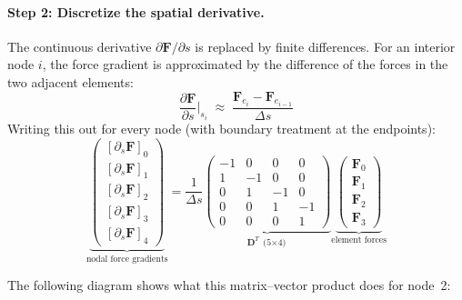 \documentclass[11pt]{article}
\newcommand{\vect}[1]{\mathbf{#1}}
\newcommand{\mat}[1]{\mathbf{#1}}
\newcommand{\dds}[1]{\frac{\partial #1}{\partial s}}
\begin{document}
\paragraph{Step 2: Discretize the spatial derivative.}
The continuous derivative $\partial \vect{F} / \partial s$ is replaced by finite differences.
For an interior node $i$, the force gradient is approximated by the difference of the forces in the two adjacent elements:
\begin{equation}
  \dds{\vect{F}}\bigg|_{s_i} \;\approx\; \frac{\vect{F}_{e_i} - \vect{F}_{e_{i-1}}}{\Delta s}
  \label{eq:fd-force}
\end{equation}
Writing this out for every node (with boundary treatment at the endpoints):
\begin{equation}
  \underbrace{\begin{pmatrix}
    [\partial_s \vect{F}]_0 \\ [\partial_s \vect{F}]_1 \\ [\partial_s \vect{F}]_2 \\ [\partial_s \vect{F}]_3 \\ [\partial_s \vect{F}]_4
  \end{pmatrix}}_{\text{nodal force gradients}}
  = \frac{1}{\Delta s}
  \underbrace{\begin{pmatrix}
    -1 &  0 &  0 &  0 \\
     1 & -1 &  0 &  0 \\
     0 &  1 & -1 &  0 \\
     0 &  0 &  1 & -1 \\
     0 &  0 &  0 &  1
  \end{pmatrix}}_{\mat{D}^T \;\text{(5$\times$4)}}
  \underbrace{\begin{pmatrix}
    \vect{F}_0 \\ \vect{F}_1 \\ \vect{F}_2 \\ \vect{F}_3
  \end{pmatrix}}_{\text{element forces}}
  \label{eq:DT-example}
\end{equation}

\noindent
The following diagram shows what this matrix--vector product does for node~2:
\end{document}
